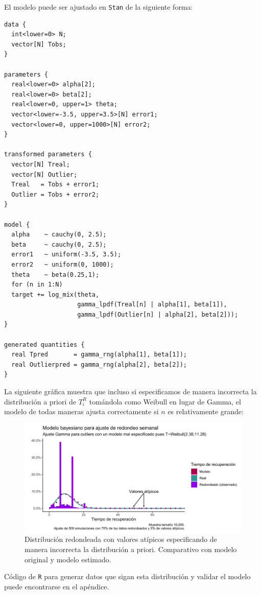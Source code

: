 \documentclass[
]{article}
\begin{document}
El modelo puede ser ajustado en \texttt{Stan} de la siguiente forma:

\begin{verbatim}
data {
  int<lower=0> N;
  vector[N] Tobs;
}

parameters {
  real<lower=0> alpha[2];
  real<lower=0> beta[2];
  real<lower=0, upper=1> theta;
  vector<lower=-3.5, upper=3.5>[N] error1;
  vector<lower=0, upper=1000>[N] error2;
}

transformed parameters {
  vector[N] Treal;
  vector[N] Outlier;
  Treal   = Tobs + error1; 
  Outlier = Tobs + error2; 
}

model {
  alpha    ~ cauchy(0, 2.5);
  beta     ~ cauchy(0, 2.5);
  error1   ~ uniform(-3.5, 3.5);
  error2   ~ uniform(0, 1000);
  theta    ~ beta(0.25,1);
  for (n in 1:N)
  target += log_mix(theta,
                    gamma_lpdf(Treal[n] | alpha[1], beta[1]),
                    gamma_lpdf(Outlier[n] | alpha[2], beta[2]));
}

generated quantities {
  real Tpred       = gamma_rng(alpha[1], beta[1]);
  real Outlierpred = gamma_rng(alpha[2], beta[2]);
}
\end{verbatim}

La siguiente gráfica muestra que incluso si especificamos de manera
incorrecta la distribución a priori de \(T_i^{R}\) tomándola como
Weibull en lugar de Gamma, el modelo de todas maneras ajusta
correctamente si \(n\) es relativamente grande:

\begin{figure}
\centering
\includegraphics{images/Atipicosweibull.png}
\caption{Distribución redondeada con valores atípicos especificando de
manera incorrecta la distribución a priori. Comparativo con modelo
original y modelo estimado.}
\end{figure}

Código de \texttt{R} para generar datos que sigan esta distribución y
validar el modelo puede encontrarse en el apéndice.
\end{document}
